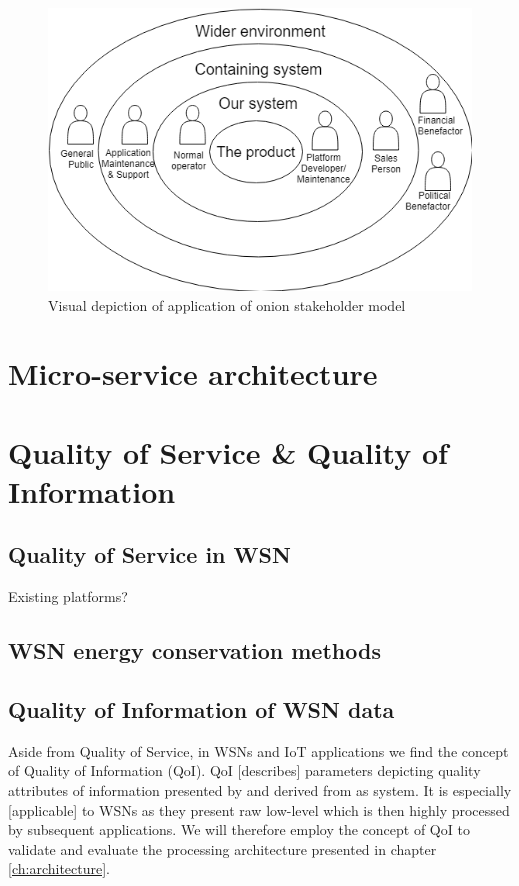 \begin{figure}
\centering
\includegraphics[width=.7\textwidth]{resources/img/onion.png}
\caption{Visual depiction of application of onion stakeholder model}
\label{fig:onion}
\end{figure}
\section{Micro-service architecture}
\section{Quality of Service \& Quality of Information}
\subsection{Quality of Service in WSN} 
Existing platforms?
\subsection{WSN energy conservation methods} 
\subsection{Quality of Information of WSN data}
\label{sec:back:qoi}
Aside from Quality of Service, in WSNs and IoT applications we find the concept of Quality of Information (QoI). QoI [describes] parameters depicting quality attributes of information presented by and derived from as system. It is especially [applicable] to WSNs as they present raw low-level which is then highly processed by subsequent applications. We will therefore employ the concept of QoI to validate and evaluate the processing architecture presented in chapter \ref{ch:architecture}.

